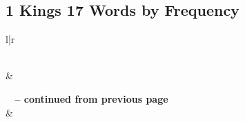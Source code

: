 

\subsection{1 Kings 17 Words by Frequency}


\normalsize
 
\begin{center}
\begin{longtable}{l|r}
\caption[1 Kings 17 Words by Frequency]{1 Kings 17 Words by Frequency}\label{table:WordsbyFrequency for 1 Kings 17} \\
\hline {} &  \\ \hline 
\endfirsthead
 
{{\bfseries \tablename\ \thetable{} -- continued from previous page}} \\  
\hline {} &  \\ \hline 
\endhead
 

\end{longtable}
\end{center}
